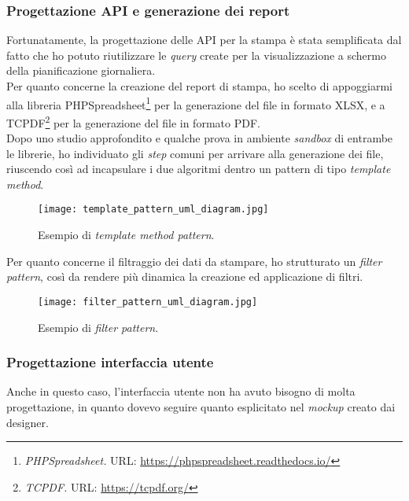 \subsubsection{Progettazione API e generazione dei report}
Fortunatamente, la progettazione delle API per la stampa è stata semplificata dal fatto che ho potuto riutilizzare le \textit{query} create per la visualizzazione a schermo della pianificazione giornaliera. \\
Per quanto concerne la creazione del report di stampa, ho scelto di appoggiarmi alla libreria PHPSpreadsheet\footnote{\textit{PHPSpreadsheet.} URL: \href{https://phpspreadsheet.readthedocs.io/en/latest/}{https://phpspreadsheet.readthedocs.io/}} per la generazione del file in formato XLSX, e a TCPDF\footnote{\textit{TCPDF.} URL: \href{https://tcpdf.org/}{https://tcpdf.org/}} per la generazione del file in formato PDF.\\
Dopo uno studio approfondito e qualche prova in ambiente \textit{sandbox} di entrambe le librerie, ho individuato gli \textit{step} comuni per arrivare alla generazione dei file, riuscendo così ad incapsulare i due algoritmi dentro un pattern di tipo \textit{template method}.\\
\begin{figure}[h]
\texttt{[image: template\_pattern\_uml\_diagram.jpg]}
\centering
\caption{Esempio di \textit{template method pattern}.}
\label{fig:template-pattern}
\end{figure}

Per quanto concerne il filtraggio dei dati da stampare, ho strutturato un \textit{filter pattern}, così da rendere più dinamica la creazione ed applicazione di filtri. \\
\begin{figure}[h]
\texttt{[image: filter\_pattern\_uml\_diagram.jpg]}
\centering
\caption{Esempio di \textit{filter pattern}.}
\label{fig:filter-pattern}
\end{figure}

\subsubsection{Progettazione interfaccia utente}
Anche in questo caso, l'interfaccia utente non ha avuto bisogno di molta progettazione, in quanto dovevo seguire quanto esplicitato nel \textit{mockup} creato dai designer.
